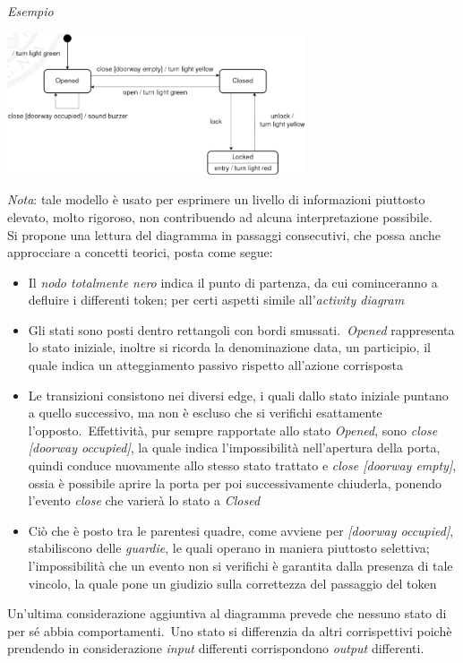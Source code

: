 \documentclass{article}
\begin{document}
\textit{Esempio}
\begin{center}
    \includegraphics[width=0.66\textwidth]{foto 2.png}
\end{center}
\textit{Nota}: tale modello è usato per esprimere un livello di informazioni piuttosto elevato, molto rigoroso, non contribuendo ad alcuna interpretazione possibile.\vspace*{14pt}\\
Si propone una lettura del diagramma in passaggi consecutivi, che possa anche approcciare a concetti teorici, posta come segue:
\begin{itemize}[label={-}]
    \itemsep0em
    \item Il \textit{nodo totalmente nero} indica il punto di partenza, da cui cominceranno a defluire i differenti token; per certi aspetti simile all'\textit{activity diagram}
    \item Gli stati sono posti dentro rettangoli con bordi smussati.\ \textit{Opened} rappresenta lo stato iniziale, inoltre si ricorda la denominazione data, un participio, il quale indica un atteggiamento passivo rispetto all'azione corrisposta
    \item Le transizioni consistono nei diversi edge, i quali dallo stato iniziale puntano a quello successivo, ma non è escluso che si verifichi esattamente l'opposto.\ Effettività, pur sempre rapportate allo stato \textit{Opened}, sono \textit{close [doorway occupied]}, la quale indica l'impossibilità nell'apertura della porta, quindi conduce nuovamente allo stesso stato trattato e \textit{close [doorway empty]}, ossia è possibile aprire la porta per poi successivamente chiuderla, ponendo l'evento \textit{close} che varierà lo stato a \textit{Closed} 
    \item Ciò che è posto tra le parentesi quadre, come avviene per \textit{[doorway occupied]}, stabiliscono delle \textit{guardie}, le quali operano in maniera piuttosto selettiva; l'impossibilità che un evento non si verifichi è garantita dalla presenza di tale vincolo, la quale pone un giudizio sulla correttezza del passaggio del token
\end{itemize}
Un'ultima considerazione aggiuntiva al diagramma prevede che nessuno stato di per sé abbia comportamenti.\ Uno stato si differenzia da altri corrispettivi poichè prendendo in considerazione \textit{input} differenti corrispondono \textit{output} differenti.
\end{document}
